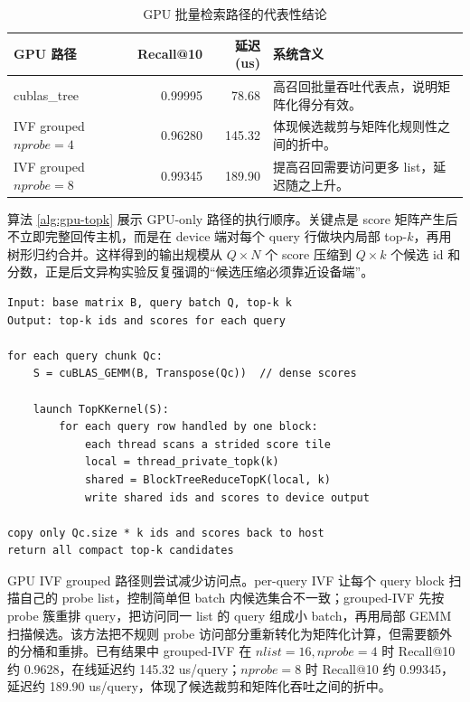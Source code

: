\documentclass[a4paper,11pt,UTF8]{ctexart}
\begin{document}
\begin{table}[H]
  \centering\footnotesize
  \begin{tabularx}{\textwidth}{p{3.0cm}r r Y}
    \toprule
    GPU 路径 & Recall@10 & 延迟(us) & 系统含义 \\
    \midrule
    cublas\_tree & 0.99995 & 78.68 & 高召回批量吞吐代表点，说明矩阵化得分有效。 \\
    IVF grouped $nprobe=4$ & 0.96280 & 145.32 & 体现候选裁剪与矩阵化规则性之间的折中。 \\
    IVF grouped $nprobe=8$ & 0.99345 & 189.90 & 提高召回需要访问更多 list，延迟随之上升。 \\
    \bottomrule
  \end{tabularx}
  \caption{GPU 批量检索路径的代表性结论}
  \label{tab:review-gpu}
\end{table}


算法 \ref{alg:gpu-topk} 展示 GPU-only 路径的执行顺序。关键点是 score 矩阵产生后不立即完整回传主机，而是在 device 端对每个 query 行做块内局部 top-$k$，再用树形归约合并。这样得到的输出规模从 $Q\times N$ 个 score 压缩到 $Q\times k$ 个候选 id 和分数，正是后文异构实验反复强调的“候选压缩必须靠近设备端”。

\begin{lstlisting}[caption={GPU GEMM scoring with device-side tree Top-k},label={alg:gpu-topk},basicstyle=\ttfamily\scriptsize]
Input: base matrix B, query batch Q, top-k k
Output: top-k ids and scores for each query

for each query chunk Qc:
    S = cuBLAS_GEMM(B, Transpose(Qc))  // dense scores

    launch TopKKernel(S):
        for each query row handled by one block:
            each thread scans a strided score tile
            local = thread_private_topk(k)
            shared = BlockTreeReduceTopK(local, k)
            write shared ids and scores to device output

copy only Qc.size * k ids and scores back to host
return all compact top-k candidates
\end{lstlisting}

GPU IVF grouped 路径则尝试减少访问点。per-query IVF 让每个 query block 扫描自己的 probe list，控制简单但 batch 内候选集合不一致；grouped-IVF 先按 probe 簇重排 query，把访问同一 list 的 query 组成小 batch，再用局部 GEMM 扫描候选。该方法把不规则 probe 访问部分重新转化为矩阵化计算，但需要额外的分桶和重排。已有结果中 grouped-IVF 在 $nlist=16,nprobe=4$ 时 Recall@10 约 0.9628，在线延迟约 145.32 us/query；$nprobe=8$ 时 Recall@10 约 0.99345，延迟约 189.90 us/query，体现了候选裁剪和矩阵化吞吐之间的折中。
\end{document}
